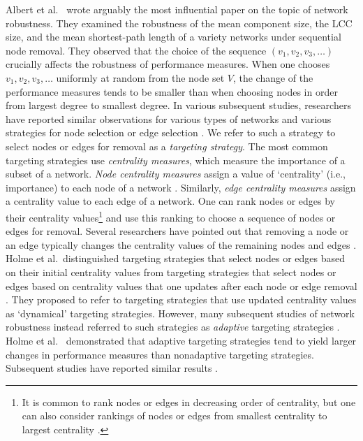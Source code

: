 \documentclass{comnet-mod}
\begin{document}
Albert et al.~\cite{Albert2000} wrote arguably the most influential paper on the topic of network robustness. They examined the robustness of the mean component size, the LCC size, and the mean shortest-path length of a variety networks under sequential node removal. They observed that the choice of the sequence $(v_1, v_2, v_3,\ldots)$ crucially affects the robustness of performance measures. When one chooses $v_1, v_2, v_3,\ldots$ uniformly at random from the node set $V$, the change of the performance measures tends to be smaller than when choosing nodes in order from largest degree to smallest degree. In various subsequent studies, researchers have reported similar observations for various types of networks and various strategies for node selection \cite{Motter2002, Herrmann2011, Lordan2014, Ventresca2014} or edge selection \cite{Hossain2013, Lordan2014}. We refer to such a strategy to select nodes or edges for removal as a \textit{targeting strategy}. The most common targeting strategies use \textit{centrality measures}, which measure the importance of a subset of a network. \textit{Node centrality measures} assign a value of  `centrality' (i.e., importance) to each node of a network \cite[p.\,159]{Newman2018}. Similarly, \textit{edge centrality measures} assign a centrality value to each edge of a network. One can rank nodes or edges by their centrality values\footnote{It is common to rank nodes or edges in decreasing order of centrality, but one can also consider rankings of nodes or edges from smallest centrality to largest centrality \cite{Dunne2002, Dunne2004, Dattilo2016}.} and use this ranking to choose a sequence of nodes or edges for removal. Several researchers have pointed out that removing a node or an edge typically changes the centrality values of the remaining nodes and edges \cite{Holme2002, girvan2002}. Holme et al.~distinguished targeting strategies that select nodes or edges based on their initial centrality values from targeting strategies that select nodes or edges based on centrality values that one updates after each node or edge removal \cite{Holme2002}. They proposed to refer to targeting strategies that use updated centrality values as {`dynamical'} targeting strategies.  However, many subsequent studies of network robustness instead referred to such strategies as \textit{adaptive} targeting strategies \cite{Herrmann2011, Zhou2014, Ma2015, Yang2015, Hong2017}. Holme et al.~\cite{Holme2002}
demonstrated that adaptive targeting strategies tend to yield larger changes in performance measures than nonadaptive targeting strategies. Subsequent studies have reported similar results \cite{Holmgren2006, Han2009, Nie2015, Lu2016, Nie2016}.
\end{document}
